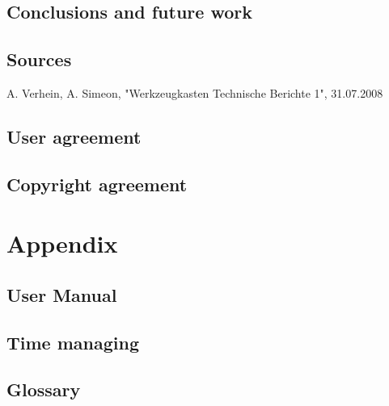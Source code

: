 \documentclass[a4paper,12pt]{scrreprt}
\begin{document}
\chapter{Conclusions and future work}
\thispagestyle{fancy}

\chapter{Sources}
\thispagestyle{fancy}
A. Verhein, A. Simeon, "Werkzeugkasten Technische Berichte 1", 31.07.2008

\chapter*{User agreement}
\chapter*{Copyright agreement}
\part{Appendix}

\chapter*{User Manual}
\chapter*{Time managing}
\chapter*{Glossary}

\thispagestyle{fancy}
\end{document}
